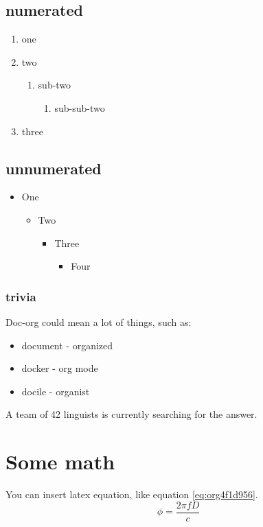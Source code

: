 \subsection{numerated}
\label{sec:org3b44f9c}
\begin{enumerate}
\item one
\item two
\begin{enumerate}
\item sub-two
\begin{enumerate}
\item sub-sub-two
\end{enumerate}
\end{enumerate}
\item three
\end{enumerate}

\subsection{unnumerated}
\label{sec:orgf1994c1}
\begin{itemize}
\item One
\begin{itemize}
\item Two
\begin{itemize}
\item Three
\begin{itemize}
\item Four
\end{itemize}
\end{itemize}
\end{itemize}
\end{itemize}

\subsubsection{trivia}
\label{sec:org7f1b979}
Doc-org could mean a lot of things, such as:
\begin{itemize}
\item document - organized
\item docker - org mode
\item docile - organist
\end{itemize}
A team of 42 linguists is currently searching for the answer.

\section{Some math}
\label{sec:org7ce5335}
You can insert latex equation, like equation \ref{eq:org4f1d956}.
\begin{equation}
\label{eq:org4f1d956}
\phi = \frac{2\pi fD}{c}
\end{equation}

